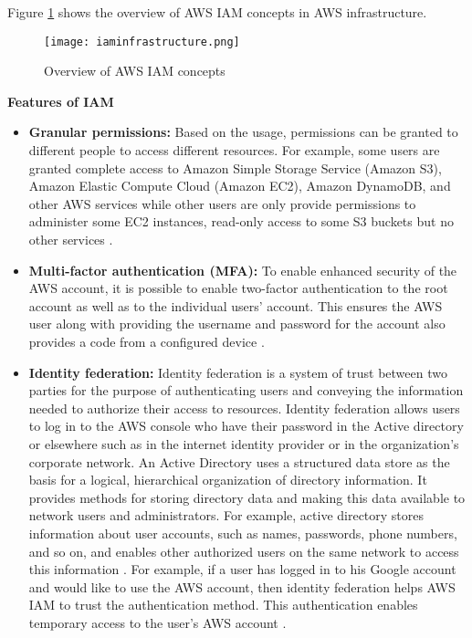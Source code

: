 Figure \ref{fig:iamidentities} shows the overview of AWS IAM concepts in AWS infrastructure.


\begin{figure}
    \centering
    \texttt{[image: iaminfrastructure.png]}
    \caption{Overview of AWS IAM concepts}
    \label{fig:iamidentities}
\end{figure}



\textbf{Features of IAM}

\begin{itemize}
    \item \textbf{Granular permissions:} Based on the usage, permissions can be granted to different people to access
    different resources. For example, some users are granted complete access to Amazon Simple Storage Service (Amazon
    S3), Amazon Elastic Compute Cloud (Amazon EC2), Amazon DynamoDB, and other AWS services while other users are only
    provide permissions to administer some EC2 instances, read-only access to some S3 buckets but no other services \cite{25}.
\end{itemize}
\begin{itemize}
    \item \textbf{Multi-factor authentication (MFA):} To enable enhanced security of the AWS account, it is possible
    to enable
    two-factor authentication to the root account as well as to the individual users’ account. This ensures the AWS user along with providing the username and password for the account also provides a code from a configured device \cite{25}.
\end{itemize}
\begin{itemize}
    \item \textbf{Identity federation:} Identity federation is a system of trust between two parties for the purpose of authenticating users and conveying the information needed to authorize their access to resources. Identity federation allows users to log in to the AWS console who have their password in the Active directory or elsewhere such as in the internet identity provider or in the organization's corporate network. An Active Directory uses a structured data store as the basis for a logical, hierarchical organization of directory information. It provides methods for storing directory data and making this data available to network users and administrators. For example, active directory stores information about user accounts, such as names, passwords, phone numbers, and so on, and enables other authorized users on the same network to access this information \cite{26}. For example, if a user has logged in to his Google account and would like to use the AWS account, then identity federation helps AWS IAM to trust the authentication method. This authentication enables temporary access to the user’s AWS account \cite{25}.
\end{itemize}
